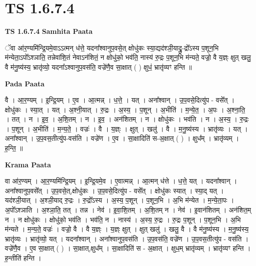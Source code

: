 \documentclass[17pt]{extarticle}
\begin{document}
\section{ TS 1.6.7.4 }

\textbf{TS 1.6.7.4 } \newline
\textbf{Samhita Paata} \newline

ॅवा आ॑र॒ण्यमि॑न्द्रि॒यमे॒वाऽऽत्मन् ध॑त्ते॒ यदना᳚श्वानुप॒वसे॒त् क्षोधु॑कः स्या॒द्यद॑श्ञी॒याद्रु॒-द्रो᳚ऽस्य प॒शून॒भि म॑न्येता॒ऽपो᳚ऽश्ञाति॒ तन्नेवा॑शि॒तं नेवाऽन॑शितं॒ न क्षोधु॑को॒ भव॑ति॒ नास्य॑ रु॒द्रः प॒शून॒भि म॑न्यते॒ वज्रो॒ वै य॒ज्ञ्ः क्षुत् खलु॒ वै म॑नु॒ष्य॑स्य॒ भ्रातृ॑व्यो॒ यदना᳚ऽश्वानुप॒वस॑ति॒ वज्रे॑णै॒व सा॒क्षात् ( ) क्षुधं॒ भ्रातृ॑व्यꣳ हन्ति ॥ \newline

\textbf{Pada Paata} \newline

वै । आ॒र॒ण्यम् । इ॒न्द्रि॒यम् । ए॒व । आ॒त्मन्न् । ध॒त्ते॒ । यत् । अना᳚श्वान् । उ॒प॒वसे॒दित्यु॑प - वसे᳚त् । क्षोधु॑कः । स्या॒त् । यत् । अ॒श्नी॒यात् । रु॒द्रः । अ॒स्य॒ । प॒शून् । अ॒भीति॑ । म॒न्ये॒त॒ । अ॒पः । अ॒श्ना॒ति॒ । तत् । न । इ॒व॒ । अ॒शि॒तम् । न । इ॒व॒ । अन॑शितम् । न । क्षोधु॑कः । भव॑ति । न । अ॒स्य॒ । रु॒द्रः । प॒शून् । अ॒भीति॑ । म॒न्य॒ते॒ । वज्रः॑ । वै । य॒ज्ञ्ः । क्षुत् । खलु॑ । वै । म॒नु॒ष्य॑स्य । भ्रातृ॑व्यः । यत् । अना᳚श्वान् । उ॒प॒वस॒तीत्यु॑प-वस॑ति । वज्रे॑ण । ए॒व । सा॒क्षादिति॑ स-अ॒क्षात् ( ) । क्षुध᳚म् । भ्रातृ॑व्यम् । ह॒न्ति॒ ॥  \newline


\textbf{Krama Paata} \newline

वा आ॑र॒ण्यम् । आ॒र॒ण्यमि॑न्द्रि॒यम् । इ॒न्द्रि॒यमे॒व । ए॒वात्मन्न् । आ॒त्मन् ध॑त्ते । ध॒त्ते॒ यत् । यदना᳚श्वान् । अना᳚श्वानुप॒वसे᳚त् । उ॒प॒वसे॒त्,क्षोधु॑कः । उ॒प॒वसे॒दित्यु॑प - वसे᳚त् । क्षोधु॑कः स्यात् । स्या॒द् यत् । यद॑श्ञी॒यात् । अ॒श्ञी॒याद् रु॒द्रः । रु॒द्रो᳚ऽस्य । अ॒स्य॒ प॒शून् । प॒शून॒भि । अ॒भि म॑न्येत । म॒न्ये॒ता॒पः । अ॒पो᳚ऽश्ञाति । अ॒श्ञा॒ति॒ तत् । तन्न । नेव॑ । इ॒वा॒शि॒तम् । अ॒शि॒तम् न । नेव॑ । इ॒वान॑शितम् । अन॑शित॒म् न । न क्षोधु॑कः । क्षोधु॑को॒ भव॑ति । भव॑ति॒ न । नास्य॑ । अ॒स्य॒ रु॒द्रः । रु॒द्रः प॒शून् । प॒शून॒भि । अ॒भि म॑न्यते । म॒न्य॒ते॒ वज्रः॑ । वज्रो॒ वै । वै य॒ज्ञ्ः । य॒ज्ञ्ः क्षुत् । क्षुत् खलु॑ । खलु॒ वै । वै म॑नु॒ष्य॑स्य । म॒नु॒ष्य॑स्य॒ भ्रातृ॑व्यः । भ्रातृ॑व्यो॒ यत् । यदना᳚श्वान् । अना᳚श्वानुप॒वस॑ति । उ॒प॒वस॑ति॒ वज्रे॑ण । उ॒प॒वस॒तीत्यु॑प - वस॑ति । वज्रे॑णै॒व । ए॒व सा॒क्षात् ( ) । सा॒क्षात्,क्षुध᳚म् । सा॒क्षादिति॑ स - अ॒क्षात् । क्षुध॒म् भ्रातृ॑व्यम् । भ्रातृ॑व्यꣳ हन्ति । ह॒न्तीति॑ हन्ति । \newline
\end{document}
